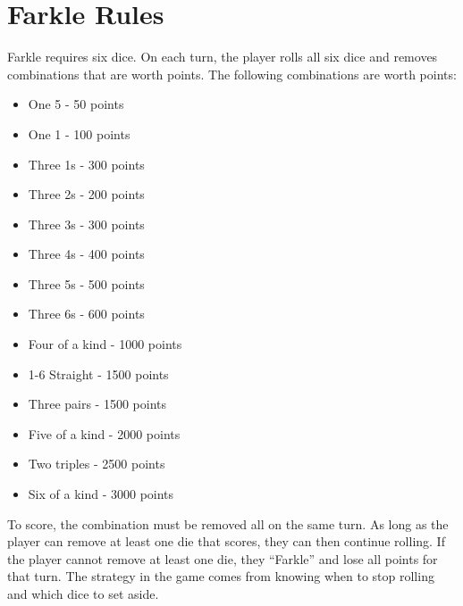 \documentclass{article}
\begin{document}
\appendix
\section{Farkle Rules}
\label{sec:farklerules}

Farkle requires six dice.  On each turn, the player rolls all six dice and
removes combinations that are worth points.  The following combinations are
worth points:

\begin{itemize}
\item One 5 - 50 points
\item One 1 - 100 points
\item Three 1s - 300 points
\item Three 2s - 200 points
\item Three 3s - 300 points
\item Three 4s - 400 points
\item Three 5s - 500 points
\item Three 6s - 600 points
\item Four of a kind - 1000 points
\item 1-6 Straight   - 1500 points
\item Three pairs    - 1500 points
\item Five of a kind - 2000 points
\item Two triples    - 2500 points
\item Six of a kind  - 3000 points
\end{itemize}

To score, the combination must be removed all on the same turn.  As long as the
player can remove at least one die that scores, they can then continue rolling.
If the player cannot remove at least one die, they ``Farkle'' and lose all
points for that turn.  The strategy in the game comes from knowing when to stop
rolling and which dice to set aside.
\end{document}
